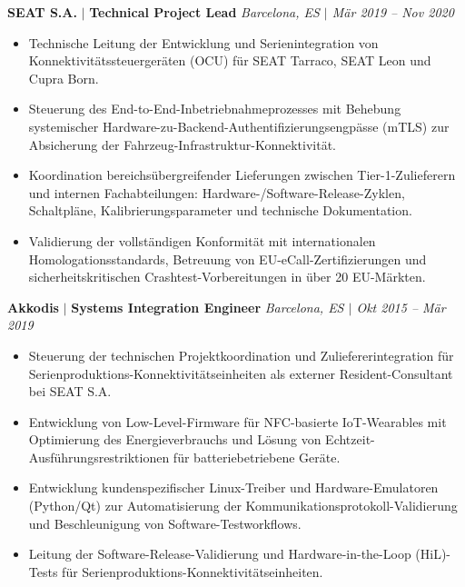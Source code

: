 \documentclass[a4paper,10pt]{article}
\begin{document}
\vspace{6pt}
\textbf{SEAT S.A.} $|$ \textbf{Technical Project Lead} \hfill \textit{Barcelona, ES $|$ M{\"a}r 2019 -- Nov 2020}
\begin{itemize}
\item Technische Leitung der Entwicklung und Serienintegration von Konnektivit{\"a}tssteuerger{\"a}ten (OCU) f{\"u}r SEAT Tarraco, SEAT Leon und Cupra Born.
\item Steuerung des End-to-End-Inbetriebnahmeprozesses mit Behebung systemischer Hardware-zu-Backend-Authentifizierungsengp{\"a}sse (mTLS) zur Absicherung der Fahrzeug-Infrastruktur-Konnektivit{\"a}t.
\item Koordination bereichs{\"u}bergreifender Lieferungen zwischen Tier-1-Zulieferern und internen Fachabteilungen: Hardware-/Software-Release-Zyklen, Schaltpl{\"a}ne, Kalibrierungsparameter und technische Dokumentation.
\item Validierung der vollst{\"a}ndigen Konformit{\"a}t mit internationalen Homologationsstandards, Betreuung von EU-eCall-Zertifizierungen und sicherheitskritischen Crashtest-Vorbereitungen in {\"u}ber 20 EU-M{\"a}rkten.
\end{itemize}

\vspace{6pt}
\textbf{Akkodis} $|$ \textbf{Systems Integration Engineer} \hfill \textit{Barcelona, ES $|$ Okt 2015 -- M{\"a}r 2019}
\begin{itemize}
\item Steuerung der technischen Projektkoordination und Zuliefererintegration f{\"u}r Serienproduktions-Konnektivit{\"a}tseinheiten als externer Resident-Consultant bei SEAT S.A.
\item Entwicklung von Low-Level-Firmware f{\"u}r NFC-basierte IoT-Wearables mit Optimierung des Energieverbrauchs und L{\"o}sung von Echtzeit-Ausf{\"u}hrungsrestriktionen f{\"u}r batteriebetriebene Ger{\"a}te.
\item Entwicklung kundenspezifischer Linux-Treiber und Hardware-Emulatoren (Python/Qt) zur Automatisierung der Kommunikationsprotokoll-Validierung und Beschleunigung von Software-Testworkflows.
\item Leitung der Software-Release-Validierung und Hardware-in-the-Loop (HiL)-Tests f{\"u}r Serienproduktions-Konnektivit{\"a}tseinheiten.
\end{itemize}
\end{document}
